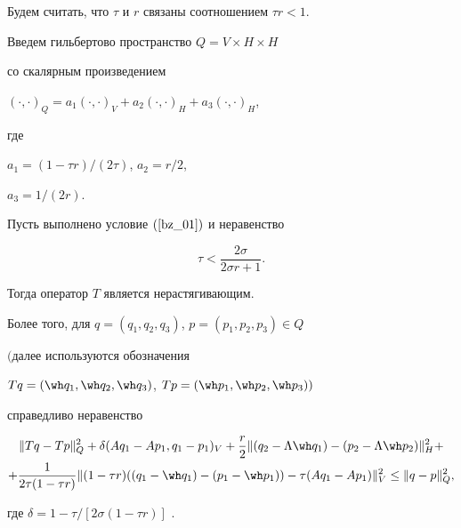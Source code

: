 Будем считать, что $\tau$ и $ r$ связаны соотношением ${\tau r < 1}$.


Введем гильбертово пространство $Q=V \times H \times H$ 


со скалярным произведением 


$(\cdot,\cdot)_Q=


a_1 (\cdot,\cdot)_V+a_2 (\cdot,\cdot)_H+ 


a_3 (\cdot,\cdot)_H$, 


где \linebreak


$a_1={(1-\tau r)} / {(2 \tau)} $, $a_2={r}/ {2}$, 


$a_3={1} / {(2 r)}$.


 





\begin{thm} \label{bz_T4}


Пусть выполнено условие $(\ref{bz_01})$ и неравенство


\begin{equation}


\tau < \frac {2 \sigma} {2 \sigma r +1}. 


\label{2bz18}


\end{equation}


Тогда оператор $T$ является нерастягивающим. 





Более того, для $q =(q_1, q_2, q_3)$, $p =(p_1, p_2, p_3) \in Q$ 


$($далее используются обозначения \linebreak


$T q=(\wh q_1, \wh q_2 , \wh q_3)$, $T p=(\wh p_1, \wh p_2, \wh p_3))$


справедливо неравенство


\begin{multline}


\| {T q-T p} \|_Q^2+\delta (A q_1-A p_1, q_1-p_1)_V+


\frac {r} {2} \| (q_2-\Lambda \wh q_1)-(p_2-\Lambda \wh p_2) \|_H^2+\\


%


+\frac {1}{2 \tau (1-\tau r)} \| (1-\tau r) ((q_1 -\wh q_1)- (p_1- \wh p_1))


- \tau (A q_1- A p_1) \|_V^2


\leq \| {q-p} \|_Q^2 ,


\label{du03_22}


\end{multline}


где $\delta =1-{\tau} / {[2 \sigma (1-\tau r) ]}$ .


\end{thm}








